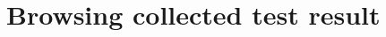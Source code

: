 \hypertarget{group___browsing_collected_test_result}{
\section{Browsing collected test result}
\label{group___browsing_collected_test_result}
}
